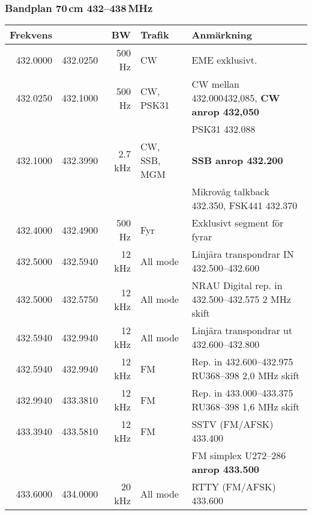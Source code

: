 \subsubsection{Bandplan 70\,cm 432--438\,MHz}
\begin{tabular}{rrrll}
	\textbf{Frekvens} &          & \textbf{BW} & \textbf{Trafik} & \textbf{Anmärkning}   \\ \hline
	
	
432.0000 & 432.0250 & 500 Hz  & CW           & EME exklusivt.                                               \\ \hline
432.0250 & 432.1000 & 500 Hz  & CW, PSK31    & CW mellan \num{432,000}{432,085}, \textbf{CW anrop 432,050}  \\
         &          &         &              & PSK31 \num{432,088}                                          \\ \hline
432.1000 & 432.3990 & 2.7 kHz & CW, SSB, MGM & \textbf{SSB anrop \num{432,200}}                             \\
         &          &         &              & Mikrovåg talkback \num{432,350}, FSK441 \num{432,370}        \\ \hline
432.4000 & 432.4900 & 500 Hz  & Fyr          & Exklusivt segment för fyrar                                  \\ \hline
432.5000 & 432.5940 & 12 kHz  & All mode     & Linjära transpondrar IN \numrange{432,500}{432,600}          \\ \hline
432.5000 & 432.5750 & 12 kHz  & All mode     & NRAU Digital rep. in \numrange{432,500}{432,575} 2 MHz skift \\ \hline
432.5940 & 432.9940 & 12 kHz  & All mode     & Linjära transpondrar ut \numrange{432,600}{432,800}          \\ \hline
432.5940 & 432.9940 & 12 kHz  & FM           & Rep. in \numrange{432,600}{432,975} RU368--398 2,0 MHz skift \\ \hline
432.9940 & 433.3810 & 12 kHz  & FM           & Rep. in \numrange{433,000}{433,375} RU368--398 1,6 MHz skift \\ \hline
433.3940 & 433.5810 & 12 kHz  & FM           & SSTV (FM/AFSK) \num{433,400}                                 \\
         &          &         &              & FM simplex U272--286 \textbf{anrop \num{433,500}}            \\ \hline
433.6000 & 434.0000 & 20 kHz  & All mode     & RTTY (FM/AFSK) \num{433,600}                                 \\

\end{tabular}
